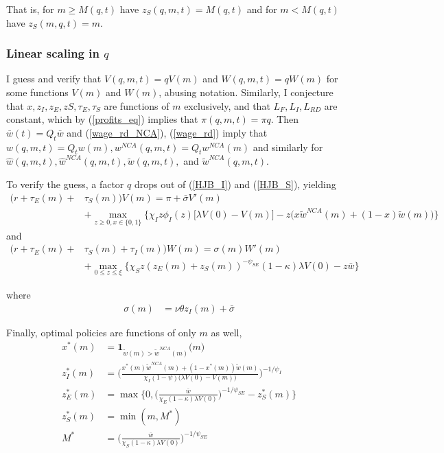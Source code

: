 \documentclass[11pt,english]{article}
\theoremstyle{remark}
\begin{document}
That is, for $m \ge M(q,t)$ have $z_S(q,m,t) = M(q,t)$ and for $m < M(q,t)$ have $z_S(m,q,t) = m$. 


\subsubsection{Linear scaling in $q$}

I guess and verify that $V(q,m,t) = q V(m)$ and $W(q,m,t) = qW(m)$ for some functions $V(m)$ and $W(m)$, abusing notation. Similarly, I conjecture that $x,z_I,z_E,zS,\tau_E,\tau_S$ are functions of $m$ exclusively, and that $L_F,L_I,L_{RD}$ are constant, which by (\ref{profits_eq}) implies that $\pi(q,m,t) = \pi q$. Then $\bar{w}(t) = Q_t \bar{w}$ and (\ref{wage_rd_NCA}), (\ref{wage_rd}) imply that $w(q,m,t) = Q_t w(m),w^{NCA}(q,m,t) = Q_tw^{NCA}(m)$ and similarly for $\hat{w}(q,m,t),\hat{w}^{NCA}(q,m,t),\tilde{w}(q,m,t),$ and $\tilde{w}^{NCA}(q,m,t)$. 

To verify the guess, a factor $q$ drops out of (\ref{HJB_I}) and (\ref{HJB_S}), yielding
\begin{align}
(r + \tau_E(m) + &\tau_S(m)) V(m) = \pi + \bar{\sigma}V'(m) \nonumber \\
       &+ \max_{z \ge 0, x \in \{0,1\}} \Big\{  \chi_I z \phi_I(z) \Big[\lambda V(0) - V(m) \Big] - z \Big(x \tilde{w}^{NCA}(m) + (1-x) \tilde{w}(m) \Big) \Big\} \label{BGP_HJB_I}
\end{align} 
and 
\begin{align}
(r + \tau_E(m) + &\tau_S(m) + \tau_I(m))W(m) = \sigma(m) W'(m) \nonumber \\
		&+ \max_{0 \le z \le \xi} \Big\{  \chi_S z (z_E(m) + z_S(m))^{-\psi_{SE}} (1-\kappa) \lambda V(0) - z \bar{w} \Big\} \label{BGP_HJB_S} 
\end{align}

where
\begin{align}
		\sigma(m) &= \nu \theta z_I(m) + \bar{\sigma} 
\end{align}

Finally, optimal policies are functions of only $m$ as well, 
\begin{align}
	x^*(m) &= \textbf{1}_{\tilde{w}(m) > \tilde{w}^{NCA}(m)} \big(m\big) \\
	z_I^*(m) &= \Bigg( \frac{x^*(m) \tilde{w}^{NCA}(m) + (1-x^*(m)) \tilde{w}(m)}{\chi_I (1-\psi) \Big(\lambda V(0) - V(m) \Big)} \Bigg)^{-1/\psi_I} \\
	z_E^*(m) &= \max \Bigg\{0, \Big(\frac{\overline{w}}{\chi_E (1-\kappa) \lambda V(0)} \Big)^{-1 / \psi_{SE}} - z_S^*(m)\Bigg\} \\
	z_S^*(m) &= \min(m,M^*) \\
	M^* &= \Big(\frac{\overline{w}}{\chi_S (1-\kappa) \lambda V(0)} \Big)^{-1 / \psi_{SE}}
\end{align}
\end{document}
